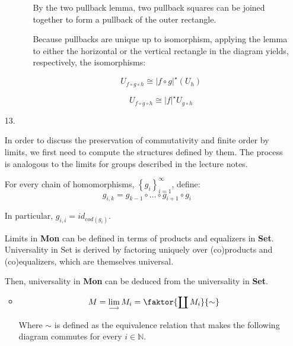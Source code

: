 \documentclass{article}
\begin{document}
\begin{enumerate}
\begin{itemize}
\begin{itemize}
          By the two pullback lemma, two pullback squares can be joined
          together to form a pullback of the outer rectangle.

          Because pullbacks are unique up to isomorphism, applying the
          lemma to either the horizontal or the vertical rectangle
          in the diagram yields, respectively, the isomorphisms:

          
          $$ U_{f \circ g \circ h} \cong \vert f \circ g \vert^\star (U_h)$$

          $$ U_{f \circ g \circ h} \cong \vert f \vert^\star U_{g\circ h} $$

        \end{itemize}
        
   \end{itemize}

   \item[13.]

     In order to discuss the preservation of commutativity and finite order
     by limits, we first need to compute the structures defined by them.
     The process is analogous to the limits for groups described in
     the lecture notes.
     
     For every chain of homomorphisms,  $\left\{g_i\right\}_{i=1}^\infty$, define:
     $$g_{i,k} = g_{k-1} \circ … \circ g_{i+1} \circ g_i$$

     In particular, $g_{i,i} = id_{cod(g_i)}$.

     Limits in {\bf Mon} can be defined in terms of products and equalizers
     in {\bf Set}. Universality in Set is derived by factoring uniquely
     over (co)products and (co)equalizers, which are themselves universal.

     Then, universality in {\bf Mon} can be deduced from the
     universality in {\bf Set}.
     
     \begin{itemize}
       \item
         
         $$M = \lim_{\longrightarrow} M_i = \faktor{\coprod M_i}{\sim}$$

         Where $\sim$ is defined as the equivalence relation that makes
         the following diagram commutes for every $i \in \mathbb{N}$. 

\end{itemize}
\end{enumerate}
\end{document}
